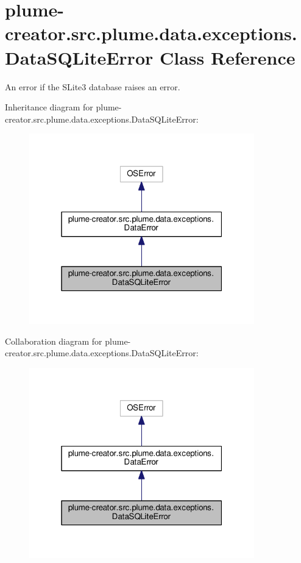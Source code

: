 \hypertarget{classplume-creator_1_1src_1_1plume_1_1data_1_1exceptions_1_1_data_s_q_lite_error}{}\section{plume-\/creator.src.\+plume.\+data.\+exceptions.\+Data\+S\+Q\+Lite\+Error Class Reference}
\label{classplume-creator_1_1src_1_1plume_1_1data_1_1exceptions_1_1_data_s_q_lite_error}


An error if the S\+Lite3 database raises an error.  




Inheritance diagram for plume-\/creator.src.\+plume.\+data.\+exceptions.\+Data\+S\+Q\+Lite\+Error\+:
\nopagebreak
\begin{figure}[H]
\begin{center}
\leavevmode
\includegraphics[width=277pt]{classplume-creator_1_1src_1_1plume_1_1data_1_1exceptions_1_1_data_s_q_lite_error__inherit__graph}
\end{center}
\end{figure}


Collaboration diagram for plume-\/creator.src.\+plume.\+data.\+exceptions.\+Data\+S\+Q\+Lite\+Error\+:
\nopagebreak
\begin{figure}[H]
\begin{center}
\leavevmode
\includegraphics[width=277pt]{classplume-creator_1_1src_1_1plume_1_1data_1_1exceptions_1_1_data_s_q_lite_error__coll__graph}
\end{center}
\end{figure}


